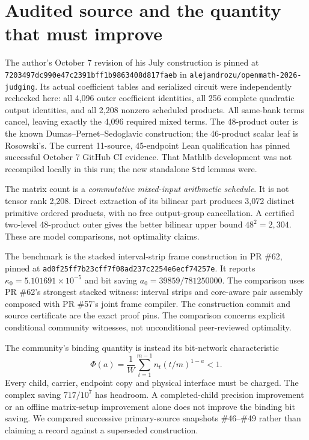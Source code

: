\documentclass[11pt]{article}
\begin{document}
\section{Audited source and the quantity that must improve}
The author's October 7 revision of his July construction is pinned at
\texttt{7203497dc990e47c2391bff1b9863408d817faeb} in
\texttt{alejandrozu/openmath-2026-judging}. Its actual coefficient tables and
serialized circuit were independently rechecked here: all 4,096 outer
coefficient identities, all 256 complete quadratic output identities, and
all 2,208 nonzero scheduled products. All same-bank terms cancel, leaving
exactly the 4,096 required mixed terms. The 48-product outer is the known
Dumas--Pernet--Sedoglavic construction; the 46-product scalar leaf is Rosowski's.
The current 11-source, 45-endpoint Lean qualification has pinned successful
October 7 GitHub CI evidence. That Mathlib development was not recompiled
locally in this run; the new standalone \texttt{Std} lemmas were.

The matrix count is a \emph{commutative mixed-input arithmetic schedule}.
It is not tensor rank 2,208. Direct extraction of its bilinear part produces
3,072 distinct primitive ordered products, with no free output-group
cancellation. A certified two-level 48-product outer gives the better
bilinear upper bound $48^2=2,304$. These are model comparisons, not optimality
claims.

The benchmark is the stacked interval-strip frame construction in PR \#62, pinned at
\texttt{ad0f25ff7b23cff7f08ad237c2254e6ecf74257e}. It reports
$\kappa_0=5.101691\times10^{-5}$ and bit saving
$a_0=39859/781250000$. The comparison uses PR \#62's strongest stacked witness: interval strips and
core-aware pair assembly composed with PR \#57's joint frame compiler.
The construction commit and source certificate are the exact proof pins. The comparison concerns explicit conditional
community witnesses, not unconditional peer-reviewed optimality.

The community's binding quantity is instead its bit-network characteristic
\begin{equation}\label{eq:moment}
 \Phi(a)=\frac1W\sum_{t=1}^{m-1} n_t(t/m)^{1-a}<1.
\end{equation}
Every child, carrier, endpoint copy and physical interface must be charged.
The complex saving $717/10^7$ has headroom. A completed-child precision
improvement or an offline matrix-setup improvement alone does not improve
the binding bit saving. We compared successive primary-source snapshots
\#46--\#49 rather than claiming a record against a superseded construction.
\end{document}
